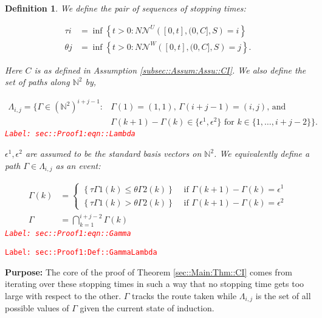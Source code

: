 \documentclass[12pt]{article}
\newcommand{\mb}{\mathbb}
\newcommand{\mc}{\mathcal}
\newcommand{\te}{\text}
\newcommand{\ep}{\epsilon}
\newcommand{\tr}{\textcolor{red}}
\newcommand{\labe}[1]{\tr{\texttt{Label: #1}}}
\newcommand{\purpose}{\textbf{Purpose: }}
\renewcommand{\U}{U}							%
\newcommand{\UU}{W}								%
\renewcommand{\S}{S}							%
\newcommand{\ev}{\ep}							%
\renewcommand{\t}{t}							%
\newcommand{\neigh}{\mc{N}}						%
\newcommand{\vind}[1]{^{#1}}					%
\newcommand{\const}{C}							%
\newcommand{\poiss}{N}							%
\newcommand{\rt}{\tau}							%
\newcommand{\rtt}{\theta}						%
\renewcommand{\it}{k}							%
\newcommand{\apath}{\Gamma}						%
\newcommand{\pathset}[2]{\Lambda_{#1,#2}}		%
\newtheorem{defn}[thms]{Definition}
\begin{document}
\begin{defn}
We define the pair of sequences of stopping times:

\begin{align*}
\rt{i} &= \inf \left\{\t > 0: \poiss{\neigh\vind{\U}}\left([0,\t],(0,\const{}],\S\right) = i\right\}\\
\rtt{j} &= \inf \left\{\t > 0: \poiss{\neigh\vind{\UU}}\left([0,\t],(0,\const{}],\S\right) = j\right\}.
\end{align*}

Here \(\const{}\) is as defined in Assumption \ref{subsec::Assum:Assu::CI}. We also define the set of paths along \(\mb{N}^2\) by,

\begin{align}
\pathset{i}{j} = \{\apath{} \in (\mb{N}^2)^{i+j-1}: &\apath{}(1) = (1,1)\te{, } \apath{}(i+j-1) = (i,j)\te{, and } \nonumber\\
&\apath{}(\it+1) - \apath{}(\it)\in \{\ev\vind{1},\ev\vind{2}\}\te{ for }\it\in \{1,\dots, i+j-2\}\}.
\label{sec::Proof1:eqn::Lambda}
\end{align}
\labe{sec::Proof1:eqn::Lambda}

\(\ev\vind{1},\ev\vind{2}\) are assumed to be the standard basis vectors on \(\mb{N}^2\). We equivalently define a path \(\apath{} \in \pathset{i}{j}\) as an event:

\begin{align}
\apath{}(\it) &= \begin{cases}
\left\{\rt{\apath{1}(\it)} \leq \rtt{\apath{2}(\it)}\right\} &\te{ if } \apath{}(\it+1) - \apath{}(\it) = \ev\vind{1}\\
\left\{\rt{\apath{1}(\it)} > \rtt{\apath{2}(\it)}\right\} &\te{ if } \apath{}(\it+1) - \apath{}(\it) = \ev\vind{2}
\end{cases}\\
\apath{} &= \bigcap_{\it=1}^{i+j-2} \apath{}(\it)
\label{sec::Proof1:eqn::Gamma}
\end{align}
\labe{sec::Proof1:eqn::Gamma}
\label{sec::Proof1:Def::GammaLambda}
\end{defn}
\labe{sec::Proof1:Def::GammaLambda}

\purpose The core of the proof of Theorem \ref{sec::Main:Thm::CI} comes from iterating over these stopping times in such a way that no stopping time gets too large with respect to the other. \(\apath{}\) tracks the route taken while \(\pathset{i}{j}\) is the set of all possible values of \(\apath{}\) given the current state of induction.
\end{document}
